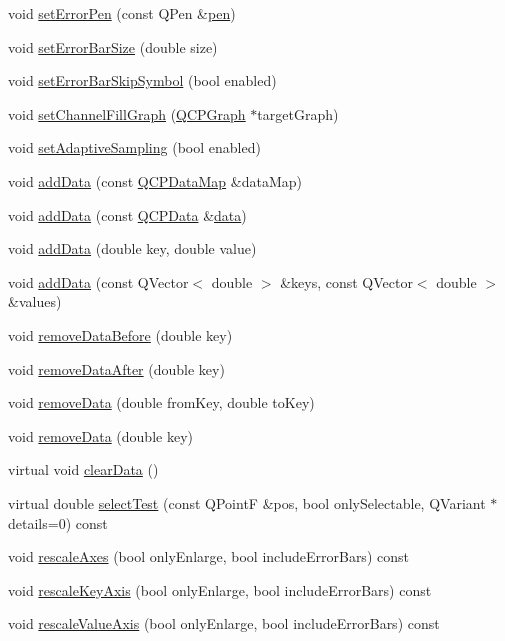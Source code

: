 \begin{DoxyCompactItemize}
\item 
void \hyperlink{classQCPGraph_abd4c7f81939e10776ea64603a704f22a}{set\+Error\+Pen} (const Q\+Pen \&\hyperlink{classQCPAbstractPlottable_a41d060007cc6b3037c9c04d22d0c0398}{pen})
\item 
void \hyperlink{classQCPGraph_a10f50c5495ce45ef559ec2066194a335}{set\+Error\+Bar\+Size} (double size)
\item 
void \hyperlink{classQCPGraph_ab1c1ee03d8dd94676a564e5e5f11aac2}{set\+Error\+Bar\+Skip\+Symbol} (bool enabled)
\item 
void \hyperlink{classQCPGraph_a2d03156df1b64037a2e36cfa50351ca3}{set\+Channel\+Fill\+Graph} (\hyperlink{classQCPGraph}{Q\+C\+P\+Graph} $\ast$target\+Graph)
\item 
void \hyperlink{classQCPGraph_ab468cd600160f327836aa0644291e64c}{set\+Adaptive\+Sampling} (bool enabled)
\item 
void \hyperlink{classQCPGraph_aa5c6181d84db72ce4dbe9dc15a34ef4f}{add\+Data} (const \hyperlink{qcustomplot_8h_a84a9c4a4c2216ccfdcb5f3067cda76e3}{Q\+C\+P\+Data\+Map} \&data\+Map)
\item 
void \hyperlink{classQCPGraph_a80cc91e1e0ef77eb50afc5b366d0efd9}{add\+Data} (const \hyperlink{classQCPData}{Q\+C\+P\+Data} \&\hyperlink{classQCPGraph_a2f58436df4f86a2792b776a21642b3d9}{data})
\item 
void \hyperlink{classQCPGraph_a0bf98b1972286cfb7b1c4b7dd6ae2012}{add\+Data} (double key, double value)
\item 
void \hyperlink{classQCPGraph_ab6da6377541fe80d892a9893a92db9c6}{add\+Data} (const Q\+Vector$<$ double $>$ \&keys, const Q\+Vector$<$ double $>$ \&values)
\item 
void \hyperlink{classQCPGraph_a9fe0b3e54e8c7b61319bd03337e21e99}{remove\+Data\+Before} (double key)
\item 
void \hyperlink{classQCPGraph_ae42d645ef617cfc75fc0df58e62c522a}{remove\+Data\+After} (double key)
\item 
void \hyperlink{classQCPGraph_a4a0fde50b7db9db0a85b5c5b6b10098f}{remove\+Data} (double from\+Key, double to\+Key)
\item 
void \hyperlink{classQCPGraph_a4a706020b4318f118381648ef18aca3f}{remove\+Data} (double key)
\item 
virtual void \hyperlink{classQCPGraph_ad4e94a4e44e5e76fbec81a72a977157d}{clear\+Data} ()
\item 
virtual double \hyperlink{classQCPGraph_abc9ff375aabcf2d21cca33d6baf85772}{select\+Test} (const Q\+PointF \&pos, bool only\+Selectable, Q\+Variant $\ast$details=0) const 
\item 
void \hyperlink{classQCPGraph_aa35b75b9032800d783df749c8a004ee9}{rescale\+Axes} (bool only\+Enlarge, bool include\+Error\+Bars) const 
\item 
void \hyperlink{classQCPGraph_a2108a729046b0ab6e0516afb249dab13}{rescale\+Key\+Axis} (bool only\+Enlarge, bool include\+Error\+Bars) const 
\item 
void \hyperlink{classQCPGraph_a2ba0e1df416486d7e74299ef8cf68bba}{rescale\+Value\+Axis} (bool only\+Enlarge, bool include\+Error\+Bars) const 
\end{DoxyCompactItemize}
